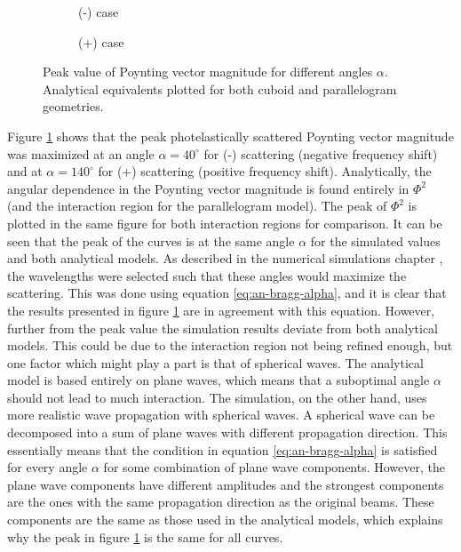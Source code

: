 \documentclass[11pt,twoside]{eitExjobb}
\begin{document}
	\begin{figure}[h]
		\centering
		\begin{subfigure}{\textwidth}
			\resizebox{\textwidth}{!}{
				
			}
			\caption{(-) case}
		\end{subfigure}
		\begin{subfigure}{\textwidth}
			\resizebox{\textwidth}{!}{
				
			}
			\caption{(+) case}
		\end{subfigure}
		\caption{\label{fig:res-angle-sweep-peak} Peak value of Poynting vector magnitude for different angles $\alpha$. Analytical equivalents plotted for both cuboid and parallelogram geometries.}
	\end{figure}
	Figure \ref{fig:res-angle-sweep-peak} shows that the peak photelastically scattered Poynting vector magnitude was maximized at an angle $\alpha = 40^\circ$ for (-) scattering (negative frequency shift) and at $\alpha = 140^\circ$ for (+) scattering (positive frequency shift). Analytically, the angular dependence in the Poynting vector magnitude is found entirely in $\Phi^2$ (and the interaction region for the parallelogram model). The peak of $\Phi^2$ is plotted in the same figure for both interaction regions for comparison. It can be seen that the peak of the curves is at the same angle $\alpha$ for the simulated values and both analytical models. As described in the numerical simulations chapter , the wavelengths were selected such that these angles would maximize the scattering. This was done using equation \eqref{eq:an-bragg-alpha}, and it is clear that the results presented in figure \ref{fig:res-angle-sweep-peak} are in agreement with this equation. However, further from the peak value the simulation results deviate from both analytical models. This could be due to the interaction region not being refined enough, but one factor which might play a part is that of spherical waves. The analytical model is based entirely on plane waves, which means that a suboptimal angle $\alpha$ should not lead to much interaction. The simulation, on the other hand, uses more realistic wave propagation with spherical waves. A spherical wave can be decomposed into a sum of plane waves with different propagation direction. This essentially means that the condition in equation \eqref{eq:an-bragg-alpha} is satisfied for every angle $\alpha$ for some combination of plane wave components. However, the plane wave components have different amplitudes and the strongest components are the ones with the same propagation direction as the original beams. These components are the same as those used in the analytical models, which explains why the peak in figure \ref{fig:res-angle-sweep-peak} is the same for all curves.
\end{document}
